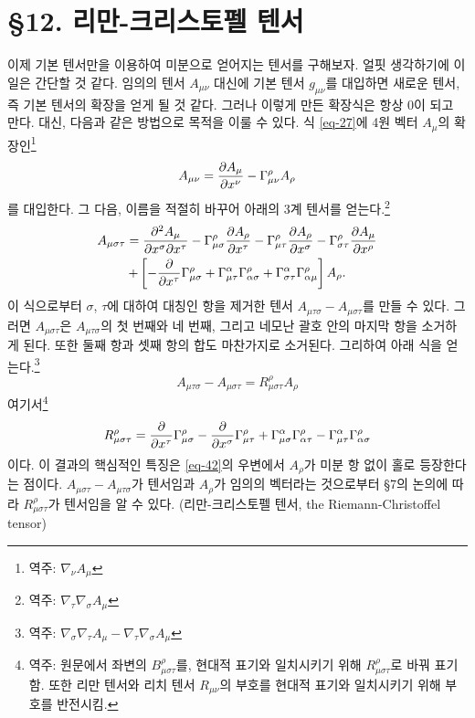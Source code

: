 \section*{\S 12. 리만-크리스토펠 텐서}
이제 기본 텐서만을 이용하여 미분으로 얻어지는 텐서를 구해보자. 얼핏 생각하기에 이 일은 간단할 것 같다. 임의의 텐서 $A_{\mu\nu}$ 대신에 기본 텐서 $g_{\mu\nu}$를 대입하면 새로운 텐서, 즉 기본 텐서의 확장을 얻게 될 것 같다. 그러나 이렇게 만든 확장식은 항상 0이 되고 만다. 대신, 다음과 같은 방법으로 목적을 이룰 수 있다. 식 \eqref{eq-27}에 4원 벡터 $A_\mu$의 확장인\footnote{역주: $\nabla_\nu A_\mu$}
\begin{equation*}
	A_{\mu\nu}={\frac{{\partial}{A_\mu}}{{\partial}{x^\nu}}}-\Gamma_{\mu\nu}^\rho A_\rho
\end{equation*}
를 대입한다. 그 다음,  이름을 적절히 바꾸어 아래의 3계 텐서를 얻는다.\footnote{역주: $\nabla_\tau \nabla_\sigma A_\mu$}
\begin{gather*}
	A_{\mu\sigma\tau}={\frac{{\partial^2}{A_\mu}}{{\partial}{x^\sigma}{\partial}{x^\tau}}}
	-\Gamma_{\mu\sigma}^{\rho}{\frac{{\partial}{A_\rho}}{{\partial}{x^\tau}}}
	-\Gamma_{\mu\tau}^{\rho}{\frac{{\partial}{A_\rho}}{{\partial}{x^\sigma}}}
	-\Gamma_{\sigma\tau}^{\rho}{\frac{{\partial}{A_\mu}}{{\partial}{x^\rho}}}\\
	+\left[
	-{\frac{{\partial}{}}{{\partial}{x^\tau}}}\Gamma_{\mu\sigma}^{\rho}
	+\Gamma_{\mu\tau}^{\alpha}\Gamma_{\alpha\sigma}^{\rho}
	+\Gamma_{\sigma\tau}^{\alpha}\Gamma_{\alpha\mu}^{\rho}
	\right] A_\rho .
\end{gather*}
이 식으로부터 $\sigma$, $\tau$에 대하여 대칭인 항을 제거한 텐서 $A_{\mu\tau\sigma}-A_{\mu\sigma\tau}$를 만들 수 있다.
그러면 $A_{\mu\sigma\tau}$은 $A_{\mu\tau\sigma}$의 첫 번째와 네 번째, 그리고 네모난 괄호 안의 마지막 항을 소거하게 된다. 또한 둘째 항과 셋째 항의 합도 마찬가지로 소거된다. 그리하여 아래 식을 얻는다.\footnote{역주: $\nabla_\sigma \nabla_\tau A_\mu - \nabla_\tau \nabla_\sigma A_\mu
	$}
\begin{equation} \label{eq-42}
	A_{\mu\tau\sigma}-A_{\mu\sigma\tau}
	= R_{\mu\sigma\tau}^\rho A_\rho
\end{equation} 
여기서\footnote{역주: 원문에서 좌변의 $B_{\mu\sigma\tau}^\rho$를, 현대적 표기와 일치시키기 위해 $R_{\mu\sigma\tau}^\rho$로 바꿔 표기함. 또한 리만 텐서와 리치 텐서 $R_{\mu\nu}$의 부호를 현대적 표기와 일치시키기 위해 부호를 반전시킴.} 
\begin{equation} \label{eq-43}
	R_{\mu\sigma\tau}^\rho = {\frac{{\partial}{}}{{\partial}{x^\tau}}}\Gamma_{\mu\sigma}^{\rho}
	- {\frac{{\partial}{}}{{\partial}{x^\sigma}}}\Gamma_{\mu\tau}^{\rho}
	+ \Gamma_{\mu\sigma}^{\alpha}\Gamma_{\alpha\tau}^{\rho}
	- \Gamma_{\mu\tau}^{\alpha}\Gamma_{\alpha\sigma}^{\rho}
\end{equation}
이다. 이 결과의 핵심적인 특징은 \eqref{eq-42}의 우변에서 $A_\rho$가 미분 항 없이 홀로 등장한다는 점이다. $A_{\mu\sigma\tau}-A_{\mu\tau\sigma}$가 텐서임과 $A_\rho$가 임의의 벡터라는 것으로부터 \S 7의 논의에 따라 $R_{\mu\sigma\tau}^\rho$가 텐서임을 알 수 있다. (리만-크리스토펠 텐서, the Riemann-Christoffel tensor)

